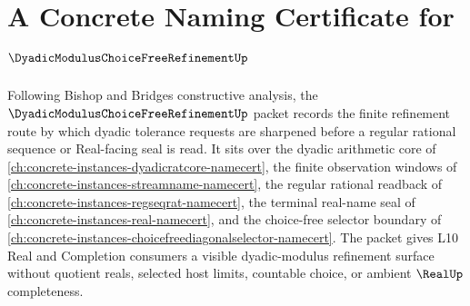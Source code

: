\chapter{A Concrete Naming Certificate for $\DyadicModulusChoiceFreeRefinementUp$}
\label{ch:concrete-instances-dyadic-modulus-choice-free-refinement-namecert}

Following Bishop and Bridges constructive analysis, the $\DyadicModulusChoiceFreeRefinementUp$ packet records the finite refinement route by which dyadic tolerance requests are sharpened before a regular rational sequence or Real-facing seal is read. It sits over the dyadic arithmetic core of \autoref{ch:concrete-instances-dyadicratcore-namecert}, the finite observation windows of \autoref{ch:concrete-instances-streamname-namecert}, the regular rational readback of \autoref{ch:concrete-instances-regseqrat-namecert}, the terminal real-name seal of \autoref{ch:concrete-instances-real-namecert}, and the choice-free selector boundary of \autoref{ch:concrete-instances-choicefreediagonalselector-namecert}. The packet gives L10 Real and Completion consumers a visible dyadic-modulus refinement surface without quotient reals, selected host limits, countable choice, or ambient $\RealUp$ completeness.

